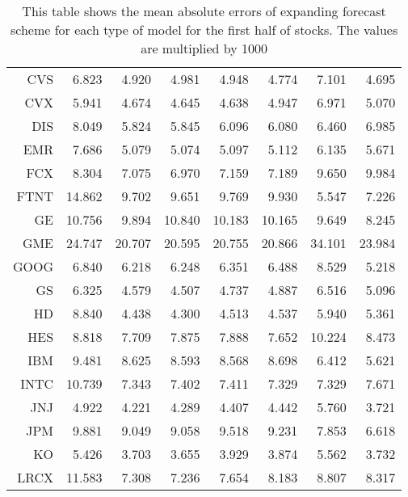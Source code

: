 \begin{table}[ht]
\begin{tabular}{rrrrrrrr}
  CVS & 6.823 & 4.920 & 4.981 & 4.948 & 4.774 & 7.101 & 4.695 \\ 
  CVX & 5.941 & 4.674 & 4.645 & 4.638 & 4.947 & 6.971 & 5.070 \\ 
  DIS & 8.049 & 5.824 & 5.845 & 6.096 & 6.080 & 6.460 & 6.985 \\ 
  EMR & 7.686 & 5.079 & 5.074 & 5.097 & 5.112 & 6.135 & 5.671 \\ 
  FCX & 8.304 & 7.075 & 6.970 & 7.159 & 7.189 & 9.650 & 9.984 \\ 
  FTNT & 14.862 & 9.702 & 9.651 & 9.769 & 9.930 & 5.547 & 7.226 \\ 
  GE & 10.756 & 9.894 & 10.840 & 10.183 & 10.165 & 9.649 & 8.245 \\ 
  GME & 24.747 & 20.707 & 20.595 & 20.755 & 20.866 & 34.101 & 23.984 \\ 
  GOOG & 6.840 & 6.218 & 6.248 & 6.351 & 6.488 & 8.529 & 5.218 \\ 
  GS & 6.325 & 4.579 & 4.507 & 4.737 & 4.887 & 6.516 & 5.096 \\ 
  HD & 8.840 & 4.438 & 4.300 & 4.513 & 4.537 & 5.940 & 5.361 \\ 
  HES & 8.818 & 7.709 & 7.875 & 7.888 & 7.652 & 10.224 & 8.473 \\ 
  IBM & 9.481 & 8.625 & 8.593 & 8.568 & 8.698 & 6.412 & 5.621 \\ 
  INTC & 10.739 & 7.343 & 7.402 & 7.411 & 7.329 & 7.329 & 7.671 \\ 
  JNJ & 4.922 & 4.221 & 4.289 & 4.407 & 4.442 & 5.760 & 3.721 \\ 
  JPM & 9.881 & 9.049 & 9.058 & 9.518 & 9.231 & 7.853 & 6.618 \\ 
  KO & 5.426 & 3.703 & 3.655 & 3.929 & 3.874 & 5.562 & 3.732 \\ 
  LRCX & 11.583 & 7.308 & 7.236 & 7.654 & 8.183 & 8.807 & 8.317 \\ 
   \hline
\end{tabular}
\caption[MAE expanding forecast (1)]{This table shows the mean absolute errors of expanding forecast scheme for each type of model for the first half of stocks. 
                     The values are multiplied by 1000} 
\label{Table:MAE_e_1}
\end{table}
